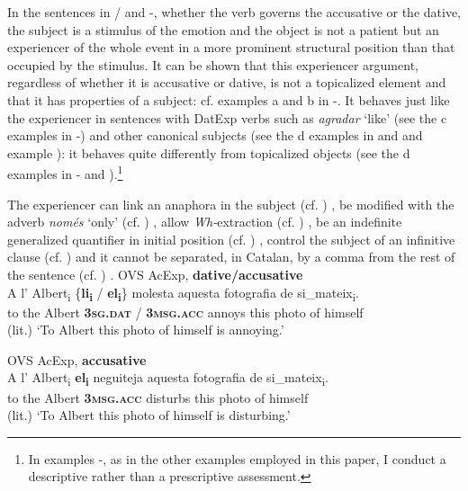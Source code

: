 \documentclass[output=paper,colorlinks,citecolor=brown,modfonts,nonflat]{langsci/langscibook}
\begin{document}
In the sentences in / and -, whether the verb governs the accusative or the dative, the subject is a stimulus of the emotion and the object is not a patient but an experiencer of the whole event in a more prominent structural position than that occupied by the stimulus. It can be shown that this experiencer argument, regardless of whether it is accusative or dative, is not a topicalized element and that it has properties of a subject: cf. examples {a} and {b} in -. It behaves just like the experiencer in sentences with DatExp verbs such as \textit{agradar} ‘like’ (see the {c} examples in -) and other canonical subjects (see the {d} examples in  and  and example ): it behaves quite differently from topicalized objects (see the {d} examples in - and ).\footnote{In examples -, as in the other examples employed in this paper, I conduct a descriptive rather than a prescriptive assessment.}

The experiencer can link an anaphora in the subject (cf. \citealt{Demonte1989, EgurenFernándezSoriano2004}) , be modified with the adverb \textit{només} ‘only’ (cf. \citealt{Cuervo1999}) , allow \textit{Wh-}extraction (cf. \citealt{BellettiRizzi1988}) , be an indefinite generalized quantifier in initial position (cf. \citealt{BellettiRizzi1988, Masullo1992quirky, Cuervo1999}) , control the subject of an infinitive clause (cf. \citealt{Campos1999, Alsina2008})  and it cannot be separated, in Catalan, by a comma from the rest of the sentence (cf. \citealt{Ginebra2003, Ginebra2005}) .
\textbf{}
\ea%
 \label{ex:royo:8}
 \ea OVS AcExp, \textbf{dative/accusative} \label{ex:royo:8a}\\
 \gll A l’ Albert\textsubscript{i} \{\textbf{li\textsubscript{i}} / \textbf{el\textsubscript{i}}\} molesta aquesta fotografia de si\_mateix\textsubscript{i}.\\
 to the Albert \textbf{\textsc{3sg.dat}} / \textbf{\textsc{3msg.acc}} annoys this photo       of himself\\
\glt (lit.) ‘To Albert this photo of himself is annoying.’


 \ex OVS AcExp, \textbf{accusative}\label{ex:royo:8b}\\
 \gll A l’ Albert\textsubscript{i} \textbf{el\textsubscript{i}} neguiteja aquesta fotografia de si\_mateix\textsubscript{i}.\\
 to the Albert \textbf{\textsc{3msg.acc} } disturbs this photo of himself\\
\glt (lit.) ‘To Albert this photo of himself is disturbing.’
\end{document}
